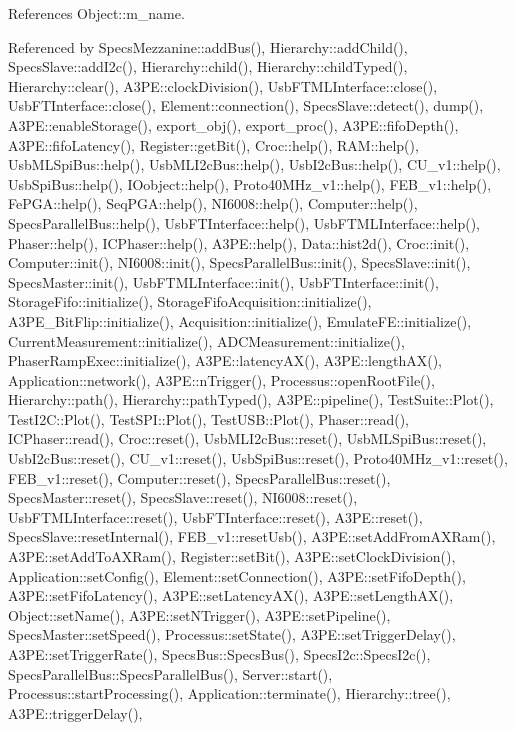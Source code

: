 References Object\+::m\+\_\+name.



Referenced by Specs\+Mezzanine\+::add\+Bus(), Hierarchy\+::add\+Child(), Specs\+Slave\+::add\+I2c(), Hierarchy\+::child(), Hierarchy\+::child\+Typed(), Hierarchy\+::clear(), A3\+P\+E\+::clock\+Division(), Usb\+F\+T\+M\+L\+Interface\+::close(), Usb\+F\+T\+Interface\+::close(), Element\+::connection(), Specs\+Slave\+::detect(), dump(), A3\+P\+E\+::enable\+Storage(), export\+\_\+obj(), export\+\_\+proc(), A3\+P\+E\+::fifo\+Depth(), A3\+P\+E\+::fifo\+Latency(), Register\+::get\+Bit(), Croc\+::help(), R\+A\+M\+::help(), Usb\+M\+L\+Spi\+Bus\+::help(), Usb\+M\+L\+I2c\+Bus\+::help(), Usb\+I2c\+Bus\+::help(), C\+U\+\_\+v1\+::help(), Usb\+Spi\+Bus\+::help(), I\+Oobject\+::help(), Proto40\+M\+Hz\+\_\+v1\+::help(), F\+E\+B\+\_\+v1\+::help(), Fe\+P\+G\+A\+::help(), Seq\+P\+G\+A\+::help(), N\+I6008\+::help(), Computer\+::help(), Specs\+Parallel\+Bus\+::help(), Usb\+F\+T\+Interface\+::help(), Usb\+F\+T\+M\+L\+Interface\+::help(), Phaser\+::help(), I\+C\+Phaser\+::help(), A3\+P\+E\+::help(), Data\+::hist2d(), Croc\+::init(), Computer\+::init(), N\+I6008\+::init(), Specs\+Parallel\+Bus\+::init(), Specs\+Slave\+::init(), Specs\+Master\+::init(), Usb\+F\+T\+M\+L\+Interface\+::init(), Usb\+F\+T\+Interface\+::init(), Storage\+Fifo\+::initialize(), Storage\+Fifo\+Acquisition\+::initialize(), A3\+P\+E\+\_\+\+Bit\+Flip\+::initialize(), Acquisition\+::initialize(), Emulate\+F\+E\+::initialize(), Current\+Measurement\+::initialize(), A\+D\+C\+Measurement\+::initialize(), Phaser\+Ramp\+Exec\+::initialize(), A3\+P\+E\+::latency\+A\+X(), A3\+P\+E\+::length\+A\+X(), Application\+::network(), A3\+P\+E\+::n\+Trigger(), Processus\+::open\+Root\+File(), Hierarchy\+::path(), Hierarchy\+::path\+Typed(), A3\+P\+E\+::pipeline(), Test\+Suite\+::\+Plot(), Test\+I2\+C\+::\+Plot(), Test\+S\+P\+I\+::\+Plot(), Test\+U\+S\+B\+::\+Plot(), Phaser\+::read(), I\+C\+Phaser\+::read(), Croc\+::reset(), Usb\+M\+L\+I2c\+Bus\+::reset(), Usb\+M\+L\+Spi\+Bus\+::reset(), Usb\+I2c\+Bus\+::reset(), C\+U\+\_\+v1\+::reset(), Usb\+Spi\+Bus\+::reset(), Proto40\+M\+Hz\+\_\+v1\+::reset(), F\+E\+B\+\_\+v1\+::reset(), Computer\+::reset(), Specs\+Parallel\+Bus\+::reset(), Specs\+Master\+::reset(), Specs\+Slave\+::reset(), N\+I6008\+::reset(), Usb\+F\+T\+M\+L\+Interface\+::reset(), Usb\+F\+T\+Interface\+::reset(), A3\+P\+E\+::reset(), Specs\+Slave\+::reset\+Internal(), F\+E\+B\+\_\+v1\+::reset\+Usb(), A3\+P\+E\+::set\+Add\+From\+A\+X\+Ram(), A3\+P\+E\+::set\+Add\+To\+A\+X\+Ram(), Register\+::set\+Bit(), A3\+P\+E\+::set\+Clock\+Division(), Application\+::set\+Config(), Element\+::set\+Connection(), A3\+P\+E\+::set\+Fifo\+Depth(), A3\+P\+E\+::set\+Fifo\+Latency(), A3\+P\+E\+::set\+Latency\+A\+X(), A3\+P\+E\+::set\+Length\+A\+X(), Object\+::set\+Name(), A3\+P\+E\+::set\+N\+Trigger(), A3\+P\+E\+::set\+Pipeline(), Specs\+Master\+::set\+Speed(), Processus\+::set\+State(), A3\+P\+E\+::set\+Trigger\+Delay(), A3\+P\+E\+::set\+Trigger\+Rate(), Specs\+Bus\+::\+Specs\+Bus(), Specs\+I2c\+::\+Specs\+I2c(), Specs\+Parallel\+Bus\+::\+Specs\+Parallel\+Bus(), Server\+::start(), Processus\+::start\+Processing(), Application\+::terminate(), Hierarchy\+::tree(), A3\+P\+E\+::trigger\+Delay(), 